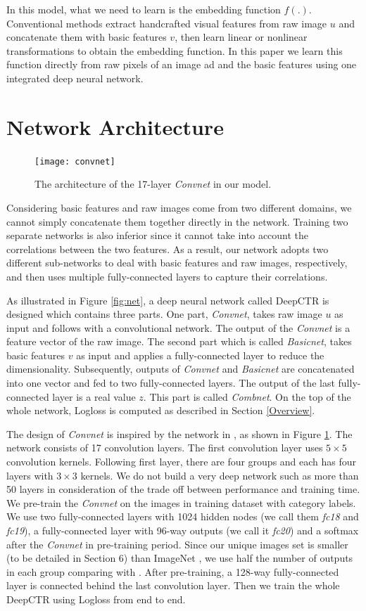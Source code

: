 \documentclass{sig-alternate}
\begin{document}
In this model, what we need to learn is the embedding function $f(.)$. Conventional methods extract handcrafted visual features from raw image $u$ and concatenate them with basic features $v$, then learn linear or nonlinear transformations to obtain the embedding function. In this paper we learn this function directly from raw pixels of an image ad and the basic features using one integrated deep neural network.  
\section{Network Architecture}
\begin{figure}
	\centering
	\texttt{[image: convnet]}
	\caption{The architecture of the 17-layer \emph{Convnet} in our model.}
	\label{fig:convnet}
\end{figure}
Considering basic features and raw images come from two different domains, we cannot simply concatenate them together directly in the network. Training two separate networks is also inferior since it cannot take into account the correlations between the two features. As a result, our network adopts two different sub-networks to deal with basic features and raw images, respectively, and then uses multiple fully-connected layers to capture their correlations. 

As illustrated in Figure \ref{fig:net},  a  deep neural network called DeepCTR is designed which contains three parts. 
One part, \emph{Convnet}, takes raw image $u$ as input and follows with a convolutional network. 
The output of the \emph{Convnet} is a feature vector of the raw image. 
The second part which is called \emph{Basicnet}, takes basic features $v$ as input and applies a fully-connected layer to reduce the dimensionality. 
Subsequently, outputs of \emph{Convnet} and \emph{Basicnet} are concatenated into one vector and fed to two fully-connected layers. 
The output of the last fully-connected layer is a real value $z$.
This part is called \emph{Combnet}. On the top of the whole network, Logloss is computed as described in Section \ref{Overview}.

The design of \emph{Convnet} is inspired by the network in \cite{he2015deep,simonyan2014very}, as shown in Figure \ref{fig:convnet}. The network consists of 17 convolution layers. The first convolution layer uses $5 \times 5$ convolution kernels. Following first layer, there are four groups and each has four layers with $3 \times 3$ kernels.  We do not build a very deep network such as more than 50 layers in consideration of the trade off between performance and training time. We pre-train the \emph{Convnet} on the images in training dataset with category labels. We use two fully-connected layers with 1024 hidden nodes (we call them \emph{fc18} and \emph{fc19}), a fully-connected layer with 96-way outputs (we call it \emph{fc20}) and a softmax after the \emph{Convnet} in pre-training period.  Since our unique images set is smaller (to be detailed in Section 6) than ImageNet \cite{deng2009imagenet}, we use half the number of outputs in each group comparing with \cite{he2015deep}. After pre-training,  a 128-way fully-connected layer is connected behind the last convolution layer.  Then we train the whole DeepCTR using Logloss from end to end.
\end{document}
